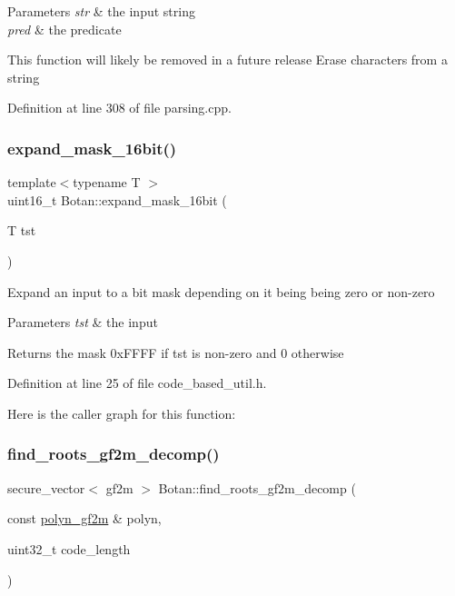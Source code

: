 \begin{DoxyParams}{Parameters}
{\em str} & the input string \\
\hline
{\em pred} & the predicate\\
\hline
\end{DoxyParams}
This function will likely be removed in a future release Erase characters from a string 

Definition at line 308 of file parsing.\+cpp.

\mbox{\label{namespace_botan_a2a0b6b61c8483eb1efca4564bb144828}} 
\subsubsection{\texorpdfstring{expand\+\_\+mask\+\_\+16bit()}{expand\_mask\_16bit()}}
{\footnotesize\ttfamily template$<$typename T $>$ \\
uint16\+\_\+t Botan\+::expand\+\_\+mask\+\_\+16bit (\begin{DoxyParamCaption}\item[{T}]{tst }\end{DoxyParamCaption})}

Expand an input to a bit mask depending on it being being zero or non-\/zero 
\begin{DoxyParams}{Parameters}
{\em tst} & the input \\
\hline
\end{DoxyParams}
\begin{DoxyReturn}{Returns}
the mask 0x\+F\+F\+FF if tst is non-\/zero and 0 otherwise 
\end{DoxyReturn}


Definition at line 25 of file code\+\_\+based\+\_\+util.\+h.

Here is the caller graph for this function\+:
\mbox{\label{namespace_botan_a664573e9a1043c872e3d0c03d4d9f2ec}} 
\subsubsection{\texorpdfstring{find\+\_\+roots\+\_\+gf2m\+\_\+decomp()}{find\_roots\_gf2m\_decomp()}}
{\footnotesize\ttfamily secure\+\_\+vector$<$ gf2m $>$ Botan\+::find\+\_\+roots\+\_\+gf2m\+\_\+decomp (\begin{DoxyParamCaption}\item[{const \mbox{\hyperlink{class_botan_1_1polyn__gf2m}{polyn\+\_\+gf2m}} \&}]{polyn,  }\item[{uint32\+\_\+t}]{code\+\_\+length }\end{DoxyParamCaption})}

